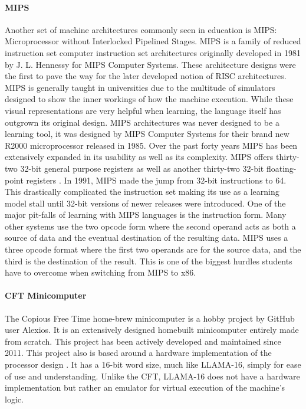 \documentclass[man,hidelinks,floatsintext]{apa7}
\begin{document}
\paragraph{MIPS}
Another set of machine architectures commonly seen in education is MIPS: Microprocessor without Interlocked Pipelined Stages. MIPS is a family of reduced instruction set computer instruction set architectures originally developed in 1981 by J. L. Hennessy for MIPS Computer Systems. These architecture designs were the first to pave the way for the later developed notion of RISC architectures. MIPS is generally taught in universities due to the multitude of simulators designed to show the inner workings of how the machine execution. While these visual representations are very helpful when learning, the language itself has outgrown its original design. MIPS architectures was never designed to be a learning tool, it was designed by MIPS Computer Systems for their brand new R2000 microprocessor released in 1985. Over the past forty years MIPS has been extensively expanded in its usability as well as its complexity. MIPS offers thirty-two 32-bit general purpose registers as well as another thirty-two 32-bit floating-point registers \parencite{mips}. In 1991, MIPS made the jump from 32-bit instructions to 64. This drastically complicated the instruction set making its use as a learning model stall until 32-bit versions of newer releases were introduced. One of the major pit-falls of learning with MIPS languages is the instruction form. Many other systems use the two opcode form where the second operand acts as both a source of data and the eventual destination of the resulting data. MIPS uses a three opcode format where the first two operands are for the source data, and the third is the destination of the result. This is one of the biggest hurdles students have to overcome when switching from MIPS to x86.
\paragraph{CFT Minicomputer}
The Copious Free Time home-brew minicomputer is a hobby project by GitHub user Alexios. It is an extensively designed homebuilt minicomputer entirely made from scratch. This project has been actively developed and maintained since 2011. This project also is based around a hardware implementation of the processor design \parencite{cft}. It has a 16-bit word size, much like LLAMA-16, simply for ease of use and understanding. Unlike the CFT, LLAMA-16 does not have a hardware implementation but rather an emulator for virtual execution of the machine's logic.
\end{document}
